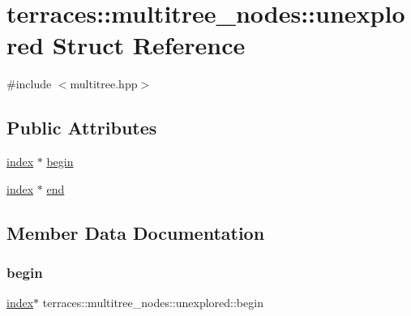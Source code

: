 \hypertarget{structterraces_1_1multitree__nodes_1_1unexplored}{}\section{terraces\+:\+:multitree\+\_\+nodes\+:\+:unexplored Struct Reference}
\label{structterraces_1_1multitree__nodes_1_1unexplored}


{\ttfamily \#include $<$multitree.\+hpp$>$}

\subsection*{Public Attributes}
\begin{DoxyCompactItemize}
\item 
\hyperlink{namespaceterraces_adbc33ccb543d1634e96d0eb02e472c77}{index} $\ast$ \hyperlink{structterraces_1_1multitree__nodes_1_1unexplored_ab5ec32670aaf0966777e2e0ca2ec9a6e}{begin}
\item 
\hyperlink{namespaceterraces_adbc33ccb543d1634e96d0eb02e472c77}{index} $\ast$ \hyperlink{structterraces_1_1multitree__nodes_1_1unexplored_afaa1f07beef3f328f44b778dc9d222eb}{end}
\end{DoxyCompactItemize}


\subsection{Member Data Documentation}
\mbox{\label{structterraces_1_1multitree__nodes_1_1unexplored_ab5ec32670aaf0966777e2e0ca2ec9a6e}} 
\subsubsection{\texorpdfstring{begin}{begin}}
{\footnotesize\ttfamily \hyperlink{namespaceterraces_adbc33ccb543d1634e96d0eb02e472c77}{index}$\ast$ terraces\+::multitree\+\_\+nodes\+::unexplored\+::begin}

\mbox{\label{structterraces_1_1multitree__nodes_1_1unexplored_afaa1f07beef3f328f44b778dc9d222eb}} 
